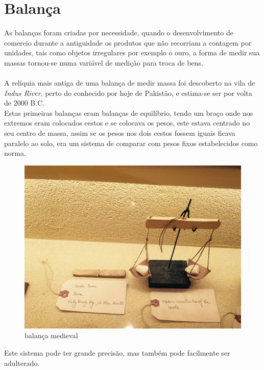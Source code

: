 \chapter{Balança}
As balanças foram criadas por necessidade, quando o desenvolvimento de comercio durante a antiguidade os produtos que não recorriam a contagem por unidades, tais como objetos irregulares por exemplo o ouro, a forma de medir sua massas tornou-se numa variável de medição para troca de bens.\\
\\
A relíquia mais antiga de uma balança de medir massa foi descoberto na vila de \textit{Indus River}, perto do conhecido por hoje de Pakistão, e estima-se ser por volta de 2000 B.C.\\
Estas primeiras balanças eram balanças de equilíbrio, tendo um braço onde nos extremos eram colocados cestos e se colocava os pesos, este estava centrado no seu centro de massa, assim se os pesos nos dois cestos fossem iguais ficava paralelo ao solo, era um sistema de comparar com pesos fixos estabelecidos como norma.
\\
\begin{figure}[H]
	\centering
	\includegraphics[scale=0.52]{./image/PESTA/general/balanca_1.jpg}
	\caption{balança medieval}
	\label{Balanca_1}
\end{figure}
Este sistema pode ter grande precisão, mas também pode facilmente ser adulterado.
\\
\\
\\
